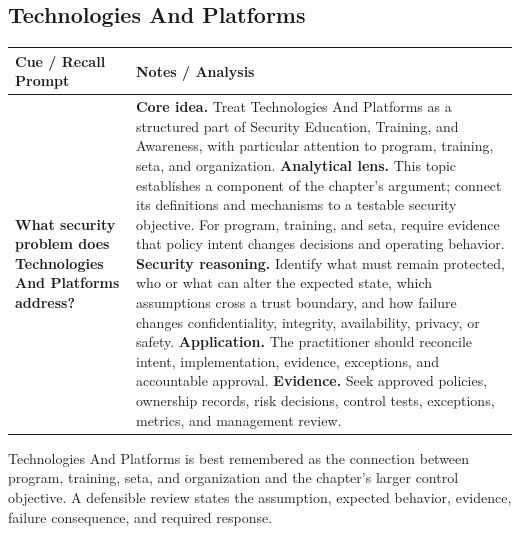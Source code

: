 \documentclass[11pt]{article}
\newcommand{\CornellHeader}{%
\rowcolor{Navy}\color{white}\bfseries Cue / Recall Prompt & \color{white}\bfseries Notes / Analysis\\\hline}
\newcommand{\CornellRow}[2]{%
\cellcolor{CueGray}\RaggedRight\textbf{#1} & \RaggedRight #2\\\hline}
\begin{document}
\subsection*{Technologies And Platforms}
\begin{longtable}{>{\RaggedRight\arraybackslash}p{}|>{\RaggedRight\arraybackslash}p{}}
\CornellHeader
\CornellRow{What security problem does Technologies And Platforms address?}{\textbf{Core idea.} Treat Technologies And Platforms as a structured part of Security Education, Training, and Awareness, with particular attention to program, training, seta, and organization. \textbf{Analytical lens.} This topic establishes a component of the chapter's argument; connect its definitions and mechanisms to a testable security objective. For program, training, and seta, require evidence that policy intent changes decisions and operating behavior. \textbf{Security reasoning.} Identify what must remain protected, who or what can alter the expected state, which assumptions cross a trust boundary, and how failure changes confidentiality, integrity, availability, privacy, or safety. \textbf{Application.} The practitioner should reconcile intent, implementation, evidence, exceptions, and accountable approval. \textbf{Evidence.} Seek approved policies, ownership records, risk decisions, control tests, exceptions, metrics, and management review.}
\end{longtable}
\begin{topicsummary}
Technologies And Platforms is best remembered as the connection between program, training, seta, and organization and the chapter's larger control objective. A defensible review states the assumption, expected behavior, evidence, failure consequence, and required response.
\end{topicsummary}
\end{document}
